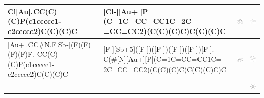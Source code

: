 \begin{landscape}
\begin{longtable}{m{7cm}m{8cm}m{2.3cm}m{2.3cm}}
 Cl[Au].CC(C)(C)P(c1ccccc1-c2ccccc2)C(C)(C)C & 
 [Cl-][Au+][P](C=1C=CC=CC1C=2C =CC=CC2)(C(C)(C)C)C(C)(C)C & 
 \includegraphics[width=2.2cm]{imagenes/sigmaAldrich/Chloro[(1,1-biphenyl-2-yl)di-tert-butylphosphine]gold(I).png} & 
 \includegraphics[width=2.2cm]{imagenes/sciFinder/pdf/Chloro[(1,1-biphenyl-2-yl)di-tert-butylphosphine]gold(I).pdf} \\
\hline



 [Au+].CC\#N.F[Sb-](F)(F)(F)(F)F. CC(C)(C)P(c1ccccc1-c2ccccc2)C(C)(C)C & 
 [F-][Sb+5]([F-])([F-])([F-])([F-])[F-]. C(\#[N][Au+][P](C=1C=CC=CC1C= 2C=CC=CC2)(C(C)(C)C)C(C)(C)C)C & 
 \includegraphics[width=2.2cm]{imagenes/sigmaAldrich/(Acetonitrile)[(2-biphenyl)di-tert-butylphosphine]gold(I) hexafluoroantimonate.jpeg} & 
 \includegraphics[width=2.2cm]{imagenes/sciFinder/pdf/(Acetonitrile)[(2-biphenyl)di-tert-butylphosphine]gold(I) hexafluoroantimonate [1compuesto].pdf} \\
  &  &  & 
 \includegraphics[width=2.2cm]{imagenes/sciFinder/pdf/(Acetonitrile)[(2-biphenyl)di-tert-butylphosphine]gold(I) hexafluoroantimonate [2compuesto].pdf} \\
\hline




\end{longtable}
\end{landscape}
